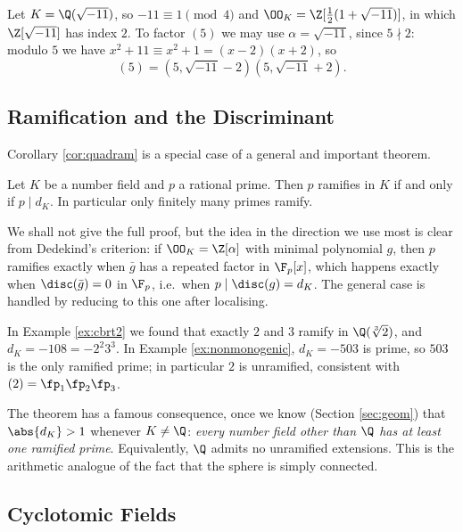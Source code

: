 \begin{example}
	Let $K = \Q(\sqrt{-11})$, so $-11 \equiv 1 \pmod 4$ and $\OO_K = \Z[\tfrac12(1+\sqrt{-11})]$, in which $\Z[\sqrt{-11}]$ has index $2$. To factor $(5)$ we may use $\alpha = \sqrt{-11}$, since $5 \nmid 2$: modulo $5$ we have $x^2+11 \equiv x^2+1 = (x-2)(x+2)$, so
	$$(5) = \left(5, \sqrt{-11}-2\right)\left(5,\sqrt{-11}+2\right).$$
\end{example}

\subsection{Ramification and the Discriminant}

Corollary \ref{cor:quadram} is a special case of a general and important theorem.

\begin{theorem}\label{thm:ramdisc}
	Let $K$ be a number field and $p$ a rational prime. Then $p$ ramifies in $K$ if and only if $p \mid d_K$. In particular only finitely many primes ramify.
\end{theorem}

We shall not give the full proof, but the idea in the direction we use most is clear from Dedekind's criterion: if $\OO_K = \Z[\alpha]$ with minimal polynomial $g$, then $p$ ramifies exactly when $\bar g$ has a repeated factor in $\F_p[x]$, which happens exactly when $\disc(\bar g) = 0$ in $\F_p$, i.e.\ when $p \mid \disc(g) = d_K$. The general case is handled by reducing to this one after localising.

\begin{example}
	In Example \ref{ex:cbrt2} we found that exactly $2$ and $3$ ramify in $\Q(\sqrt[3]2)$, and $d_K = -108 = -2^2 3^3$. In Example \ref{ex:nonmonogenic}, $d_K = -503$ is prime, so $503$ is the only ramified prime; in particular $2$ is unramified, consistent with $(2) = \fp_1\fp_2\fp_3$.
\end{example}

The theorem has a famous consequence, once we know (Section \ref{sec:geom}) that $\abs{d_K} > 1$ whenever $K \neq \Q$: \emph{every number field other than $\Q$ has at least one ramified prime}. Equivalently, $\Q$ admits no unramified extensions. This is the arithmetic analogue of the fact that the sphere is simply connected.

\subsection{Cyclotomic Fields}\label{sec:cyclo}


